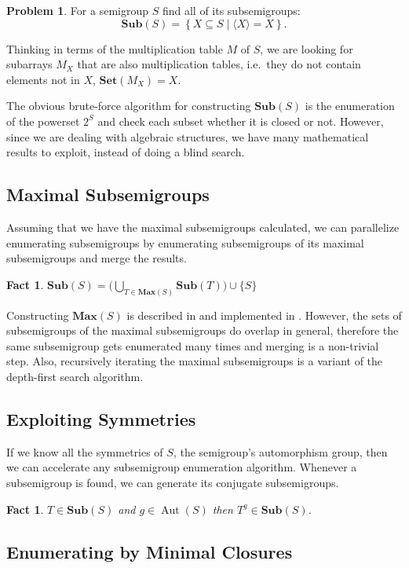 \documentclass{amsart}
\newcommand{\Sub}{\mathbf{Sub}}
\newcommand{\Set}{\mathbf{Set}}
\newcommand{\Max}{\mathbf{Max}}
\DeclareMathOperator{\Aut}{Aut}
\theoremstyle{plain}
\newtheorem{fact}[theorem]{Fact}
\theoremstyle{definition}
\newtheorem{problem}[theorem]{Problem}
\begin{document}
\begin{problem}
For a semigroup $S$ find all of its subsemigroups:
$$\Sub(S)=\left\{ X\subseteq S\mid \langle X\rangle=X\right\}.$$
\end{problem}
Thinking in terms of the multiplication table $M$ of $S$, we are looking for subarrays $M_X$ that are also multiplication tables, i.e.\ they do not contain elements not in $X$, $\Set(M_X)=X$.

The obvious brute-force algorithm for constructing $\Sub(S)$ is the enumeration of the powerset $2^S$ and check each subset whether it is closed or not.
However, since we are dealing with algebraic structures, we have many mathematical results to exploit, instead of doing a blind search.

\subsection{Maximal Subsemigroups}
Assuming that we have the maximal subsemigroups calculated, we can parallelize enumerating subsemigroups by enumerating subsemigroups of its maximal subsemigroups and merge the results.
\begin{fact}
$\Sub(S)=\big( \bigcup_{T\in \Max(S)}\Sub(T)\big)\cup \{S\}$
\end{fact}
\noindent Constructing $\Max(S)$ is described in \cite{MaxSubSemi} and implemented in \cite{Semigroups}.
However, the sets of subsemigroups of the maximal subsemigroups do overlap in general, therefore the same subsemigroup gets enumerated many times and merging is a non-trivial step.
Also, recursively iterating the maximal subsemigroups is a variant of the depth-first search algorithm.  

\subsection{Exploiting Symmetries}
If we know all the symmetries of $S$, the semigroup's automorphism group, then we can accelerate any subsemigroup enumeration algorithm.
Whenever a subsemigroup is found, we can generate its conjugate subsemigroups.
\begin{fact}
$T\in\Sub(S)$ and $g\in \Aut(S)$ then $T^g\in\Sub(S)$.%
\end{fact}


\subsection{Enumerating by Minimal Closures}
\end{document}
